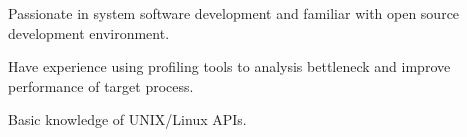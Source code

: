 

\begin{cventries}

\begin{cvitems_skill}
\item Passionate in system software development and familiar with open source development environment. 
\item Have experience using profiling tools to analysis bettleneck and improve performance of target process. 
\item Basic knowledge of UNIX/Linux APIs. 
\end{cvitems_skill}

\end{cventries}
